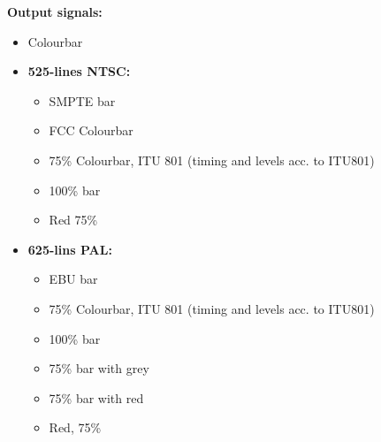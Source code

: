 \textbf{Output signals:}

\begin{itemize}
\setlength{\itemsep}{1pt}
\setlength{\parskip}{0pt}

\item Colourbar
\item \textbf{525-lines NTSC:}
\begin{itemize}
\item SMPTE bar
\item FCC Colourbar
\item 75\% Colourbar, ITU 801 (timing and levels acc. to ITU801) \\
\item 100\% bar \\
\item Red 75\% \\
\end{itemize}
\item \textbf{625-lins PAL:}
\begin{itemize}
\item EBU bar
\item 75\% Colourbar, ITU 801 (timing and levels acc. to ITU801) 
\item 100\% bar
\item 75\% bar with grey
\item 75\% bar with red
\item Red, 75\%
\end{itemize}


\end{itemize}
